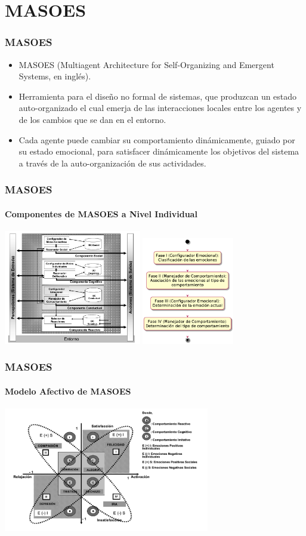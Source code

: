 \documentclass{beamer}
\begin{document}
\section{MASOES}

\begin{frame}
\frametitle{MASOES}
\begin{itemize}
	\item MASOES (Multiagent Architecture for Self-Organizing and Emergent Systems, en inglés).
  \item Herramienta para el diseño no
  formal de sistemas, que produzcan un estado auto-organizado el cual emerja de
  las interacciones locales entre los agentes y de los cambios que se dan en el
  entorno.
  \item Cada agente puede cambiar su comportamiento
  dinámicamente, guiado por su estado emocional, para satisfacer dinámicamente los
  objetivos del sistema a través de la auto-organización de sus actividades.
\end{itemize}
\end{frame}

\begin{frame}
\frametitle{MASOES}
\framesubtitle{Componentes de MASOES a Nivel Individual}
\centering
\includegraphics[width=6cm]{ilustraciones/componentes-masoes-individual}
\includegraphics[width=4cm]{ilustraciones/componente-conductual}
\end{frame}

\begin{frame}
\frametitle{MASOES}
\framesubtitle{Modelo Afectivo de MASOES}
\centering
\includegraphics[width=9cm]{ilustraciones/modelo-afectivo}
\end{frame}
\end{document}
